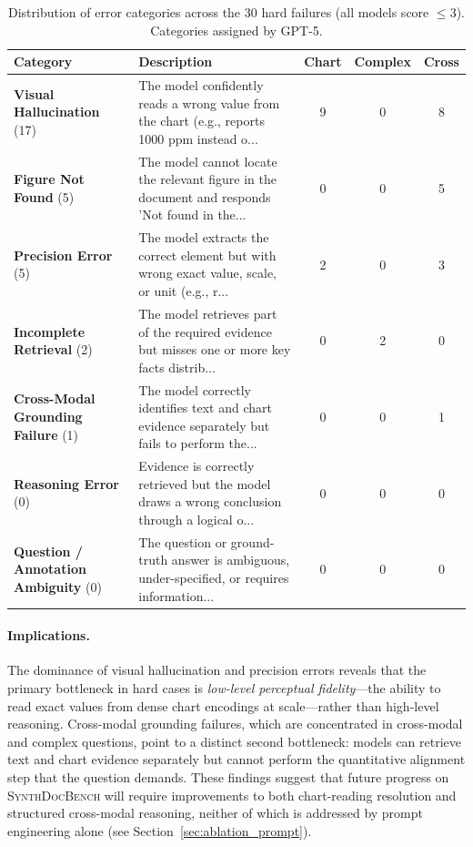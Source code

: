 \begin{table}[h]
\centering
\footnotesize
\caption{%
  Distribution of error categories across the 30 hard failures   (all models score $\leq 3$).   Categories assigned by GPT-5.
}
\label{tab:error_categories}
\begin{tabular}{@{}lp{8.5cm}ccc@{}}
\toprule
\textbf{Category} & \textbf{Description} & \textbf{Chart} & \textbf{Complex} & \textbf{Cross} \\
\midrule
  \textbf{Visual Hallucination} (17) & The model confidently reads a wrong value from the chart (e.g., reports 1000 ppm instead o... & 9 & 0 & 8 \\
  \textbf{Figure Not Found} (5) & The model cannot locate the relevant figure in the document and responds 'Not found in the... & 0 & 0 & 5 \\
  \textbf{Precision Error} (5) & The model extracts the correct element but with wrong exact value, scale, or unit (e.g., r... & 2 & 0 & 3 \\
  \textbf{Incomplete Retrieval} (2) & The model retrieves part of the required evidence but misses one or more key facts distrib... & 0 & 2 & 0 \\
  \textbf{Cross-Modal Grounding Failure} (1) & The model correctly identifies text and chart evidence separately but fails to perform the... & 0 & 0 & 1 \\
  \textbf{Reasoning Error} (0) & Evidence is correctly retrieved but the model draws a wrong conclusion through a logical o... & 0 & 0 & 0 \\
  \textbf{Question / Annotation Ambiguity} (0) & The question or ground-truth answer is ambiguous, under-specified, or requires information... & 0 & 0 & 0 \\
\bottomrule
\end{tabular}
\end{table}

\paragraph{Implications.}
The dominance of visual hallucination and precision errors reveals that the primary bottleneck in hard cases is \emph{low-level perceptual fidelity}---the ability to read exact values from dense chart encodings at scale---rather than high-level reasoning. Cross-modal grounding failures, which are concentrated in cross-modal and complex questions, point to a distinct second bottleneck: models can retrieve text and chart evidence separately but cannot perform the quantitative alignment step that the question demands. These findings suggest that future progress on \textsc{SynthDocBench} will require improvements to both chart-reading resolution and structured cross-modal reasoning, neither of which is addressed by prompt engineering alone (see Section~\ref{sec:ablation_prompt}).